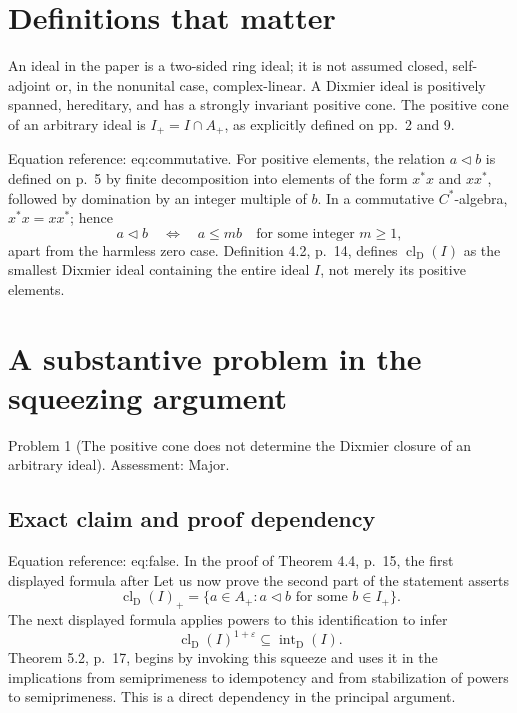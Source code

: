 \documentclass[10pt]{article}
\begin{document}
\section*{Definitions that matter}
An ideal in the paper is a two-sided ring ideal; it is not assumed closed, self-adjoint or, in the nonunital case, complex-linear. A Dixmier ideal is positively spanned, hereditary, and has a strongly invariant positive cone. The positive cone of an arbitrary ideal is \(I_+=I\cap A_+\), as explicitly defined on pp. 2 and 9.\par
Equation reference: eq:commutative. For positive elements, the relation \(a\lhd b\) is defined on p. 5 by finite decomposition into elements of the form \(x^*x\) and \(xx^*\), followed by domination by an integer multiple of \(b\). In a commutative \(C^*\)-algebra, \(x^*x=xx^*\); hence \[
 a\lhd b\quad\Longleftrightarrow\quad a\leq mb
 \quad\text{for some integer }m\geq1,\] apart from the harmless zero case. Definition 4.2, p. 14, defines \(\operatorname{cl}_{\mathrm D}(I)\) as the smallest Dixmier ideal containing the entire ideal \(I\), not merely its positive elements.\par
\section*{A substantive problem in the squeezing argument}
Problem 1 (The positive cone does not determine the Dixmier closure of an arbitrary ideal).  Assessment: Major.\par
\subsection*{Exact claim and proof dependency}
Equation reference: eq:false. In the proof of Theorem 4.4, p. 15, the first displayed formula after Let us now prove the second part of the statement asserts \[
 \operatorname{cl}_{\mathrm D}(I)_+=\{a\in A_+:a\lhd b\text{ for some }b\in I_+\}.\] The next displayed formula applies powers to this identification to infer \[\operatorname{cl}_{\mathrm D}(I)^{1+\varepsilon}\subseteq\operatorname{int}_{\mathrm D}(I).\] Theorem 5.2, p. 17, begins by invoking this squeeze and uses it in the implications from semiprimeness to idempotency and from stabilization of powers to semiprimeness. This is a direct dependency in the principal argument.\par
\end{document}
